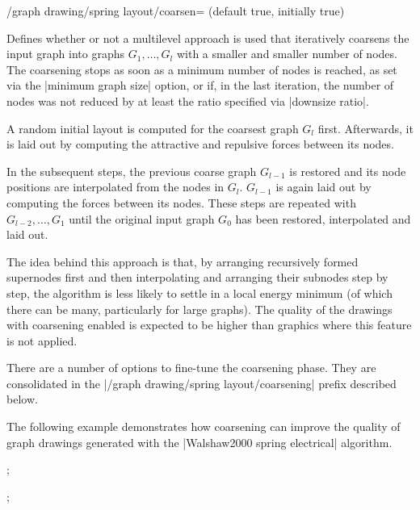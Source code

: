
\begin{key}{/graph drawing/spring layout/coarsen=
  (default true, initially true)}

  Defines whether or not a multilevel approach is used that
  iteratively coarsens the input graph into graphs $G_1,\dots,G_l$ with 
  a smaller and smaller number of nodes. The coarsening stops as soon as
  a minimum number of nodes is reached, as set via the 
  |minimum graph size| option, or if, in the last iteration, the 
  number of nodes was not reduced by at least the ratio specified via 
  |downsize ratio|. 

  A random initial layout is computed for the coarsest graph $G_l$ first.
  Afterwards, it is laid out by computing the attractive and repulsive
  forces between its nodes. 
  
  In the subsequent steps, the previous coarse graph $G_{l-1}$ is 
  restored and its node positions are interpolated from the nodes in 
  $G_l$. $G_{l-1}$ is again laid out by computing the forces between 
  its nodes. These steps are repeated with $G_{l-2},\dots,G_1$ until 
  the original input graph $G_0$ has been restored, interpolated 
  and laid out.

  The idea behind this approach is that, by arranging recursively 
  formed supernodes first and then interpolating and arranging their
  subnodes step by step, the algorithm is less likely to settle in a
  local energy minimum (of which there can be many, particularly for
  large graphs). The quality of the drawings with coarsening enabled is
  expected to be higher than graphics where this feature is not applied.

  There are a number of options to fine-tune the coarsening phase.
  They are consolidated in the |/graph drawing/spring layout/coarsening|
  prefix described below.

  The following example demonstrates how coarsening can improve the
  quality of graph drawings generated with the 
  |Walshaw2000 spring electrical| algorithm.
  \begin{codeexample}[width=5cm]

\tikz {};

\tikz {};
  \end{codeexample}
\end{key}

